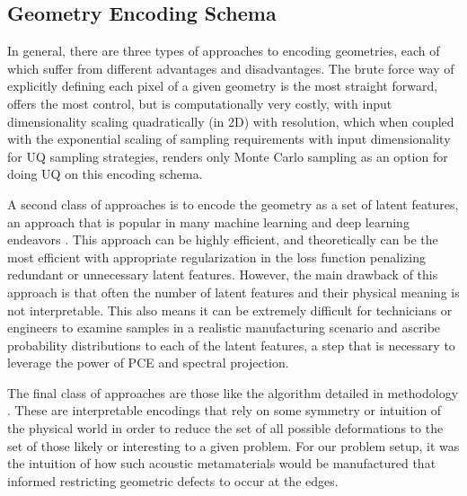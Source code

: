 \documentclass[preprint,review,12pt]{elsarticle}
\begin{document}
\subsection{Geometry Encoding Schema}
In general, there are three types of approaches to encoding geometries, each of which suffer from different advantages and disadvantages. The brute force way of explicitly defining each pixel of a given geometry is the most straight forward, offers the most control, but is computationally very costly, with input dimensionality scaling quadratically (in 2D) with resolution, which when coupled with the exponential scaling of sampling requirements with input dimensionality for UQ sampling strategies, renders only Monte Carlo sampling as an option for doing UQ on this encoding schema. 

A second class of approaches is to encode the geometry as a set of latent features, an approach that is popular in many machine learning and deep learning endeavors \citep{ChenWei2022}. This approach can be highly efficient, and theoretically can be the most efficient with appropriate regularization in the loss function penalizing redundant or unnecessary latent features. However, the main drawback of this approach is that often the number of latent features and their physical meaning is not interpretable. This also means it can be extremely difficult for technicians or engineers to examine samples in a realistic manufacturing scenario and ascribe probability distributions to each of the latent features, a step that is necessary to leverage the power of PCE and spectral projection. 

The final class of approaches are those like the algorithm detailed in methodology . These are interpretable encodings that rely on some symmetry or intuition of the physical world in order to reduce the set of all possible deformations to the set of those likely or interesting to a given problem. For our problem setup, it was the intuition of how such acoustic metamaterials would be manufactured that informed restricting geometric defects to occur at the edges. 
\end{document}
